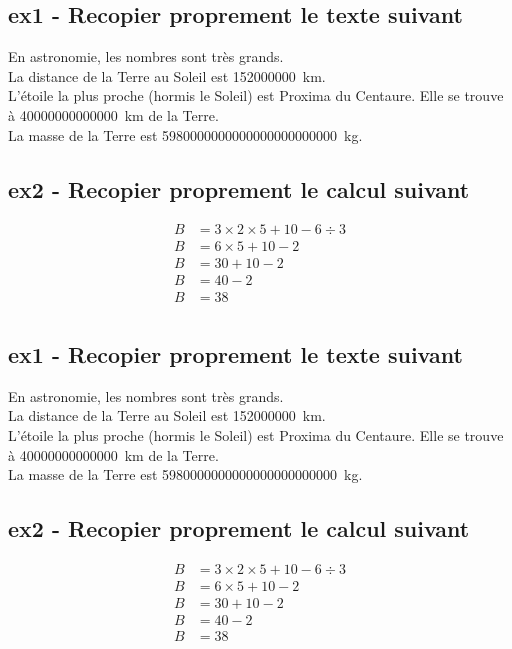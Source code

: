 \documentclass[11pt]{article}
\begin{document}
\setlength{\columnseprule}{1pt}

\subsection*{ex1 - Recopier proprement le texte suivant}

En astronomie, les nombres sont très grands. \\
La distance de la Terre au Soleil est \SI{152 000 000}{\km}. \\
L'étoile la plus proche (hormis le Soleil) est Proxima du Centaure. Elle se trouve à \SI{40 000 000 000 000}{km} de la Terre.\\
La masse de la Terre est \SI{5 980 000 000 000 000 000 000 000}{kg}.

\subsection*{ex2 - Recopier proprement le calcul suivant }

\begin{align*}
    B &= 3 \times 2 \times 5 + 10 - 6 \div 3  \\
    B &= 6 \times 5 + 10 - 2\\
    B &= 30 + 10 - 2 \\
    B &= 40 - 2\\
    B &= 38\\  
\end{align*}


\subsection*{ex1 - Recopier proprement le texte suivant}

En astronomie, les nombres sont très grands. \\
La distance de la Terre au Soleil est \SI{152 000 000}{\km}. \\
L'étoile la plus proche (hormis le Soleil) est Proxima du Centaure. Elle se trouve à \SI{40 000 000 000 000}{km} de la Terre.\\
La masse de la Terre est \SI{5 980 000 000 000 000 000 000 000}{kg}.

\subsection*{ex2 - Recopier proprement le calcul suivant }

\begin{align*}
    B &= 3 \times 2 \times 5 + 10 - 6 \div 3  \\
    B &= 6 \times 5 + 10 - 2\\
    B &= 30 + 10 - 2 \\
    B &= 40 - 2\\
    B &= 38\\  
\end{align*}
\end{document}
